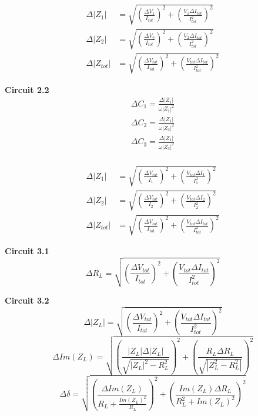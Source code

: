 \documentclass[a4paper, 12pt]{article}
\begin{document}
\begin{align}
	\Delta |Z_1| &= \sqrt{\left(\frac{\Delta V_1}{I_{tot}}\right)^2 + \left(\frac{V_1\Delta I_{tot}}{I_{tot}^2}\right)^2} \\
	\Delta |Z_2| &= \sqrt{\left(\frac{\Delta V_2}{I_{tot}}\right)^2 + \left(\frac{V_2\Delta I_{tot}}{I_{tot}^2}\right)^2} \\
	\Delta |Z_{tot}| &= \sqrt{\left(\frac{\Delta V_{tot}}{I_{tot}}\right)^2 + \left(\frac{V_{tot}\Delta I_{tot}}{I_{tot}^2}\right)^2} 
\end{align}

\textbf{Circuit 2.2}
\begin{align}
	\Delta C_1 = \frac{\Delta |Z_1|}{\omega |Z_1|^2}\\
	\Delta C_2 = \frac{\Delta |Z_1|}{\omega |Z_2|^2}\\
	\Delta C_3 = \frac{\Delta |Z_1|}{\omega |Z_3|^2}
\end{align}\\

\begin{align}
	\Delta |Z_1| &= \sqrt{\left(\frac{\Delta V_{tot}}{I_{1}}\right)^2 + \left(\frac{V_{tot}\Delta I_{1}}{I_{1}^2}\right)^2} \\
	\Delta |Z_2| &= \sqrt{\left(\frac{\Delta V_{tot}}{I_{2}}\right)^2 + \left(\frac{V_{tot}\Delta I_{2}}{I_{2}^2}\right)^2} \\
	\Delta |Z_{tot}| &= \sqrt{\left(\frac{\Delta V_{tot}}{I_{tot}}\right)^2 + \left(\frac{V_{tot}\Delta I_{tot}}{I_{tot}^2}\right)^2} 
\end{align}

\textbf{Circuit 3.1}
	\begin{equation}
		\Delta R_{L} = \sqrt{\left(\frac{\Delta V_{tot}}{I_{tot}}\right)^2 + \left(\frac{V_{tot}\Delta I_{tot}}{I_{tot}^2}\right)^2} 
	\end{equation}
	
\textbf{Circuit 3.2}
	\begin{equation}
		\Delta |Z_{L}| = \sqrt{\left(\frac{\Delta V_{tot}}{I_{tot}}\right)^2 + \left(\frac{V_{tot}\Delta I_{tot}}{I_{tot}^2}\right)^2} 
	\end{equation}
	\begin{equation}
		\Delta Im (Z_L) = \sqrt{\left(\frac{|Z_L|\Delta |Z_L|}{\sqrt{|Z_L|^2 - R_L^2}}\right)^2 + \left(\frac{R_L\Delta R_L}{\sqrt{|Z_L^2 - R_L^2|}}\right)^2}
	\end{equation}
	\begin{equation}\label{deltadelta}
	\Delta \delta = \sqrt{\left(\frac{\Delta Im(Z_L)}{R_L + \frac{Im(Z_L)^2}{R_L}}\right)^2 + \left(\frac{Im (Z_L)\Delta R_L}{R_L^2 + Im(Z_L)^2}\right)^2}	
	\end{equation}
\end{document}
